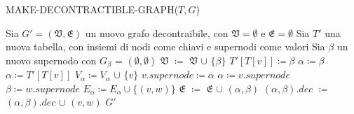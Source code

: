 \begin{algorithm}[H] 
    \caption{MAKE-DECONTRACTIBLE-GRAPH($T,G$)}\label{alg:make-decontractible-graph}
    \begin{algorithmic}[1]
        \State Sia $G' = (\mathfrak{V}, \mathfrak{E})$ un nuovo grafo decontraibile, con $\mathfrak{V} = \emptyset$
                e $\mathfrak{E} = \emptyset$
        \State Sia $T\mathcal{'}$ una nuova tabella, con insiemi di nodi come chiavi e supernodi come valori
                \State Sia $\beta$ un nuovo supernodo con $G_{\beta}$ = $(\emptyset, \emptyset)$
                \State $\mathfrak{V}$ $\coloneqq$ $\mathfrak{V}$ $\cup$ $\{\beta\}$
                \State $T'[T[v]] \coloneqq \beta$
                \State $\alpha \coloneqq \beta$
            \Else
                \State $\alpha \coloneqq T'[T[v]]$
            \EndIf
            \State $V_{\alpha} \coloneqq V_{\alpha}$ $\cup$ $\{v\}$
            \State $v.supernode \coloneqq \alpha$
        \EndFor
            \State $\alpha \coloneqq v.supernode$
            \State $\beta \coloneqq w.supernode$
            \If {$(\alpha == \beta )$}
                \State $E_{\alpha} \coloneqq E_{\alpha} \cup \{(v,w)\}$
            \Else
                    \State $\mathfrak{E}$ $\coloneqq$ $\mathfrak{E}$ $\cup$ $(\alpha , \beta)$
                \EndIf
                \State $(\alpha , \beta).dec$ $\coloneqq$ $(\alpha , \beta).dec$ $\cup$ $(v, w)$
            \EndIf
        \EndFor
        \State \Return $G'$
    \end{algorithmic}
\end{algorithm}